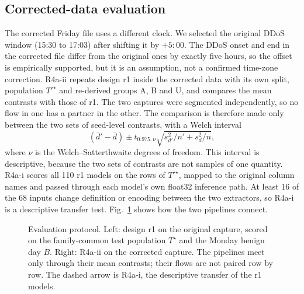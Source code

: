 \documentclass[journal]{IEEEtran}
\newcommand{\Tstar}{T^{\star}}
\begin{document}
\subsection{Corrected-data evaluation}
The corrected Friday file uses a different clock. We selected the original DDoS window (15:30 to
17:03) after shifting it by $+5{:}00$. The DDoS onset and end in the corrected file differ from the
original ones by exactly five hours, so the offset is empirically supported, but it is an
assumption, not a confirmed time-zone correction. %
R4a-ii repeats design r1 inside the corrected data with its own split, population $T'^\star$ and
re-derived groups A, B and U, and compares the mean contrasts with those of r1. The two captures
were segmented independently, so no flow in one has a partner in the other. The comparison is
therefore made only between the two sets of seed-level contrasts, with a Welch interval
\begin{equation}
(\bar d'-\bar d)\pm t_{0.975,\nu}\sqrt{s_{d'}^2/n'+s_d^2/n},
\label{eq:welch}
\end{equation}
where $\nu$ is the Welch--Satterthwaite degrees of freedom. This interval is descriptive, because
the two sets of contrasts are not samples of one quantity. R4a-i scores all 110 r1 models on the
rows of $T'^\star$, mapped to the original column names and passed through each model's own
float32 inference path. At least 16 of the 68 inputs change definition or encoding between the two
extractors, so R4a-i is a descriptive transfer test. Fig.~\ref{fig:protocol} shows how the two
pipelines connect.

\begin{figure}[!t]
\centering
\resizebox{0.92\textwidth}{!}{}
\caption{Evaluation protocol. Left: design r1 on the original capture, scored on the
family-common test population $\Tstar$ and the Monday benign day $B$. Right: R4a-ii on the corrected
capture. The pipelines meet only through their mean contrasts; their flows are not paired row by
row. The dashed arrow is R4a-i, the descriptive transfer of the r1 models.}
\label{fig:protocol}
\end{figure}
\end{document}
